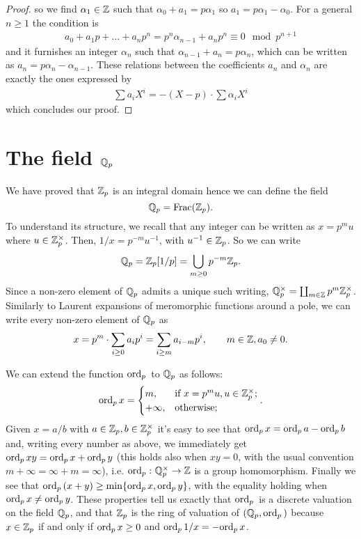 \begin{proof}
			so we find $\alpha_1 \in \mathbb{Z}$ such that $\alpha_0 + a_1 = p\alpha_1$ so $a_1 = p\alpha_1 - \alpha_0$. For a general $n \geq 1$ the condition is
			\begin{gather*}
				a_0 + a_1p + \dots + a_np^n = p^n\alpha_{n-1} + a_np^n \equiv 0 \mod p^{n+1}
			\end{gather*}
			and it furnishes an integer $\alpha_n$ such that $\alpha_{n-1} + a_n = p\alpha_n$, which can be written as $a_n = p\alpha_n - \alpha_{n-1}$. These relations between the coefficients $a_n$ and $\alpha_n$ are exactly the ones expressed by
			\begin{gather*}
				\sum a_iX^i = -(X - p) \cdot \sum \alpha_i X^i
			\end{gather*}
			which concludes our proof.
		\end{proof}
	\section{The field $\mathbb{Q}_p$}
		\label{section:Qp}
		We have proved that $\mathbb{Z}_p$ is an integral domain hence we can define the field
		\begin{equation*}
			\mathbb{Q}_p = \textrm{Frac}(\mathbb{Z}_p).
		\end{equation*}
		To understand its structure, we recall that any \padic integer can be written as $x = p^mu$ where $u \in \mathbb{Z}_p^\times$. Then, $1/x = p^{-m}u^{-1}$, with $u^{-1} \in \mathbb{Z}_p$. So we can write
		\begin{equation*}
			\mathbb{Q}_p = \mathbb{Z}_p[1/p] = \bigcup_{m \geq 0} p^{-m}\mathbb{Z}_p.
		\end{equation*}
		Since a non-zero element of $\mathbb{Q}_p$ admits a unique such writing, $\mathbb{Q}_p^\times = \coprod_{m \in \mathbb{Z}} p^m\mathbb{Z}_p^\times$. Similarly to Laurent expansions of meromorphic functions around a pole, we can write every non-zero element of $\mathbb{Q}_p$ as
		\begin{equation*}
			x = p^m \cdot \sum_{i \geq 0} a_ip^i = \sum_{i \geq m} a_{i-m}p^i, \qquad m \in \mathbb{Z}, a_0 \neq 0.
		\end{equation*}
		
		We can extend the function $\textrm{ord}_p\,$ to $\mathbb{Q}_p$ as follows:
		\begin{equation*}
			\textrm{ord}_p\, x = 
			\begin{cases}
				m, & \text{if $x = p^mu, u \in \mathbb{Z}_p^{\times}$;} \\
				+\infty, & \text{otherwise;} \\
			\end{cases}.
		\end{equation*}
		Given $x = 	a/b$ with $a \in \mathbb{Z}_p, b \in \mathbb{Z}_p^\times$ it's easy to see that $\textrm{ord}_p\, x = \textrm{ord}_p\, a - \textrm{ord}_p\, b$ and, writing every number as above, we immediately get $\textrm{ord}_p\, xy = \textrm{ord}_p\, x + \textrm{ord}_p\, y$ (this holds also when $xy = 0$, with the usual convention $m + \infty = \infty + m = \infty$), i.e. $\textrm{ord}_p\,\colon \mathbb{Q}_p^\times \to \mathbb{Z}$ is a group homomorphism. Finally we see that $\textrm{ord}_p\, (x + y) \geq \min\{\textrm{ord}_p\, x, \textrm{ord}_p\, y\}$, with the equality holding when $\textrm{ord}_p\, x \neq \textrm{ord}_p\, y$. These properties tell us exactly that $\textrm{ord}_p\,$ is a discrete valuation on the field $\mathbb{Q}_p$, and that $\mathbb{Z}_p$ is the ring of valuation of $\left(\mathbb{Q}_p, \textrm{ord}_p\,\right)$ because $x \in \mathbb{Z}_p$ if and only if $\textrm{ord}_p\, x \geq 0$ and $\textrm{ord}_p\, 1/x = - \textrm{ord}_p\, x$.
		
